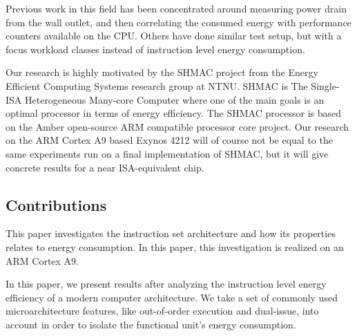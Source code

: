 Previous work in this field has been concentrated around measuring power drain
from the wall outlet, and then correlating the consumed energy with performance
counters available on the CPU\cite{singh}\cite{bertran}\cite{bircher}. Others
have done similar test setup, but with a focus workload classes instead of
instruction level energy consumption\cite{carroll2010analysis}.


Our research is highly motivated by the SHMAC project from the Energy Efficient
Computing Systems research group at NTNU. SHMAC is The Single-ISA Heterogeneous
Many-core Computer where one of the main goals is an optimal processor in terms
of energy efficiency. The SHMAC processor is based on the Amber open-source ARM
compatible processor core project. Our research on the ARM Cortex A9
based Exynos 4212 will of course not be equal to the same experiments run on
a final implementation of SHMAC, but it will give concrete results for a near
ISA-equivalent chip.


\subsection{Contributions}
This paper investigates the instruction set architecture and how its properties
relates to energy consumption. In this paper, this investigation is realized on
an ARM Cortex A9.

In this paper, we present results after analyzing the instruction level energy
efficiency of a modern computer architecture. We take a set of commonly used
microarchitecture features, like out-of-order execution and dual-issue, into
account in order to isolate the functional unit's energy consumption.

